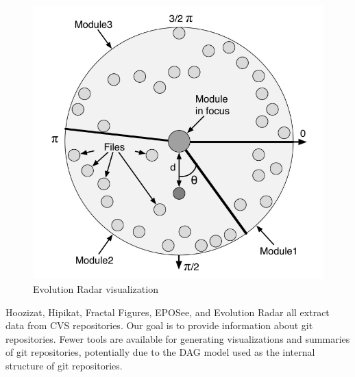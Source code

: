 \begin{figure}[htpb]
  \centering
  \includegraphics[width=0.8\linewidth]{Figures/introduction/evo_radar.png}
  \caption{Evolution Radar visualization}
  \label{fig:evolution_radar}
\end{figure}

Hoozizat, Hipikat, Fractal Figures, EPOSee, and Evolution Radar all
extract data from CVS repositories. Our goal is to provide information
about git repositories. Fewer tools are available for generating
visualizations and summaries of git repositories, potentially due to the
DAG model used as the internal structure of git repositories.

